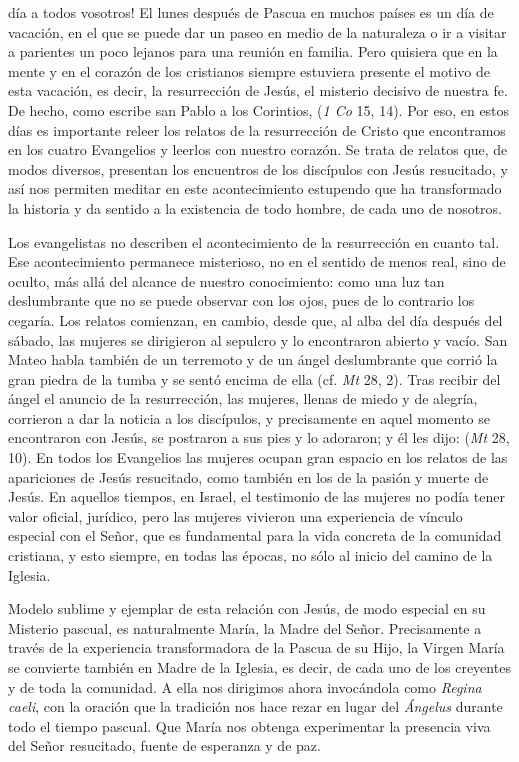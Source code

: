 \begin{body}
 día a todos vosotros! El lunes después de Pascua en muchos países es un día de vacación, en el que se puede dar un paseo en medio de la naturaleza o ir a visitar a parientes un poco lejanos para una reunión en familia. Pero quisiera que en la mente y en el corazón de los cristianos siempre estuviera presente el motivo de esta vacación, es decir, la resurrección de Jesús, el misterio decisivo de nuestra fe. De hecho, como escribe san Pablo a los Corintios,  (\textit{1 Co} 15, 14). Por eso, en estos días es importante releer los relatos de la resurrección de Cristo que encontramos en los cuatro Evangelios y leerlos con nuestro corazón. Se trata de relatos que, de modos diversos, presentan los encuentros de los discípulos con Jesús resucitado, y así nos permiten meditar en este acontecimiento estupendo que ha transformado la historia y da sentido a la existencia de todo hombre, de cada uno de nosotros.

Los evangelistas no describen el acontecimiento de la resurrección en cuanto tal. Ese acontecimiento permanece misterioso, no en el sentido de menos real, sino de oculto, más allá del alcance de nuestro conocimiento: como una luz tan deslumbrante que no se puede observar con los ojos, pues de lo contrario los cegaría. Los relatos comienzan, en cambio, desde que, al alba del día después del sábado, las mujeres se dirigieron al sepulcro y lo encontraron abierto y vacío. San Mateo habla también de un terremoto y de un ángel deslumbrante que corrió la gran piedra de la tumba y se sentó encima de ella (cf. \textit{Mt} 28, 2). Tras recibir del ángel el anuncio de la resurrección, las mujeres, llenas de miedo y de alegría, corrieron a dar la noticia a los discípulos, y precisamente en aquel momento se encontraron con Jesús, se postraron a sus pies y lo adoraron; y él les dijo:  (\textit{Mt} 28, 10). En todos los Evangelios las mujeres ocupan gran espacio en los relatos de las apariciones de Jesús resucitado, como también en los de la pasión y muerte de Jesús. En aquellos tiempos, en Israel, el testimonio de las mujeres no podía tener valor oficial, jurídico, pero las mujeres vivieron una experiencia de vínculo especial con el Señor, que es fundamental para la vida concreta de la comunidad cristiana, y esto siempre, en todas las épocas, no sólo al inicio del camino de la Iglesia.

Modelo sublime y ejemplar de esta relación con Jesús, de modo especial en su Misterio pascual, es naturalmente María, la Madre del Señor. Precisamente a través de la experiencia transformadora de la Pascua de su Hijo, la Virgen María se convierte también en Madre de la Iglesia, es decir, de cada uno de los creyentes y de toda la comunidad. A ella nos dirigimos ahora invocándola como \textit{Regina caeli}, con la oración que la tradición nos hace rezar en lugar del \textit{Ángelus} durante todo el tiempo pascual. Que María nos obtenga experimentar la presencia viva del Señor resucitado, fuente de esperanza y de paz.
\end{body}

